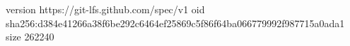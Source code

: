 version https://git-lfs.github.com/spec/v1
oid sha256:d384e41266a38f6be292c6464ef25869c5f86f64ba066779992f987715a0ada1
size 262240
